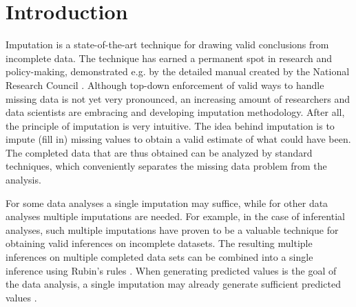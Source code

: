 \documentclass[bimj,fleqn]{w-art}
\begin{document}
\maketitle          %







\section{Introduction}

Imputation is a state-of-the-art technique for drawing valid conclusions from incomplete data. The technique has earned a permanent spot in research and policy-making, demonstrated e.g. by the detailed manual created by the National Research Council \citep*{little2012prevention}. Although top-down enforcement of valid ways to handle missing data is not yet very pronounced, an increasing amount of researchers and data scientists are embracing and developing imputation methodology. After all, the principle of imputation is very intuitive. The idea behind imputation is to impute (fill in) missing values to obtain a valid estimate of what could have been. The completed data that are thus obtained can be analyzed by standard techniques, which conveniently separates the missing data problem from the analysis. 

For some data analyses a single imputation may suffice, while for other data analyses multiple imputations are needed. For example, in the case of inferential analyses, such multiple imputations \citep{rubi76} have proven to be a valuable technique for obtaining valid inferences on incomplete datasets. The resulting multiple inferences on multiple completed data sets can be combined into a single inference using Rubin's rules \citep[][p. 76]{rubi87}. When generating predicted values is the goal of the data analysis, a single imputation may already generate sufficient predicted values \citep{nijm20}. 
\end{document}
